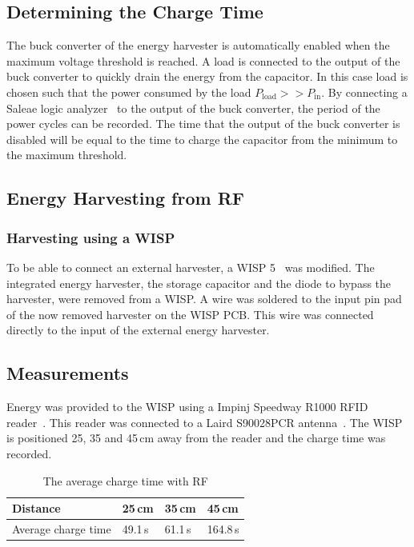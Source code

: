 \subsection{Determining the Charge Time}

The buck converter of the energy harvester is automatically enabled when the maximum voltage threshold is reached.
A load is connected to the output of the buck converter to quickly drain the energy from the capacitor.
In this case load is chosen such that the power consumed by the load $P_{\text{load}} >> P_{\text{in}}$.
By connecting a Saleae logic analyzer~\cite{saleae_2017} to the output of the buck converter, the period of the power cycles can be recorded.
The time that the output of the buck converter is disabled will be equal to the time to charge the capacitor from the minimum to the maximum threshold.

\subsection{Energy Harvesting from RF}

\subsubsection{Harvesting using a WISP}
To be able to connect an external harvester, a WISP 5~\cite{sample_transim_2008} was modified.
The integrated energy harvester, the storage capacitor and the diode to bypass the harvester, were removed from a WISP.
A wire was soldered to the input pin pad of the now removed harvester on the WISP PCB.
This wire was connected directly to the input of the external energy harvester.

\subsection{Measurements}
Energy was provided to the WISP using a Impinj Speedway R1000 RFID reader~\cite{impinj_eol_2017, indy_r1000_2017}.
This reader was connected to a Laird S90028PCR antenna~\cite{laird_s9028pcr_2017}.
The WISP is positioned 25, 35 and 45\,cm away from the reader and the charge time was recorded.

\begin{table}[t]
	\centering
	\caption{The average charge time with RF}
	\label{tab:res_rf_harvest}
	\begin{tabular}{|l||l|l|l|}
		\hline
		Distance & 25\,cm & 35\,cm & 45\,cm \\
		\hline \hline
		Average charge time & 49.1\,s & 61.1\,s & 164.8\,s \\
		\hline
	\end{tabular}
\end{table}

